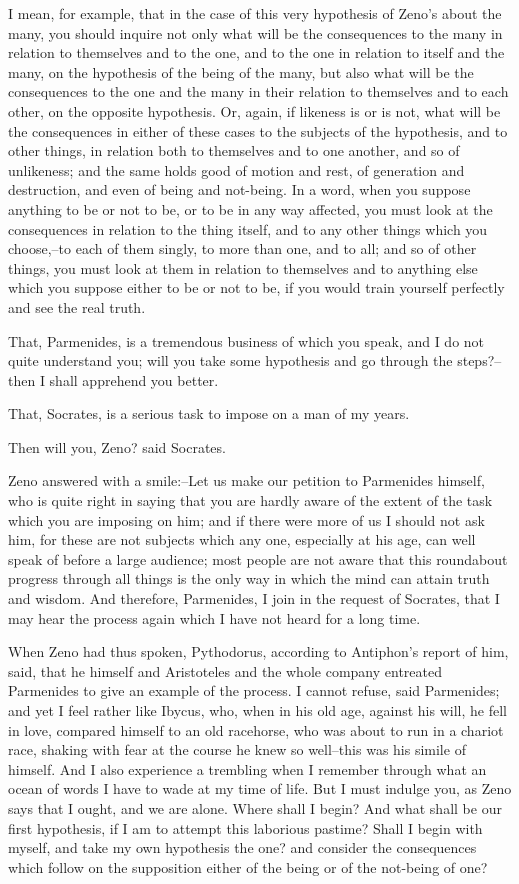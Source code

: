 I mean, for example, that in the case of this very hypothesis of
Zeno's about the many, you should inquire not only what will be the
consequences to the many in relation to themselves and to the one, and
to the one in relation to itself and the many, on the hypothesis of the
being of the many, but also what will be the consequences to the one
and the many in their relation to themselves and to each other, on the
opposite hypothesis. Or, again, if likeness is or is not, what will
be the consequences in either of these cases to the subjects of the
hypothesis, and to other things, in relation both to themselves and to
one another, and so of unlikeness; and the same holds good of motion and
rest, of generation and destruction, and even of being and not-being.
In a word, when you suppose anything to be or not to be, or to be in any
way affected, you must look at the consequences in relation to the
thing itself, and to any other things which you choose,--to each of them
singly, to more than one, and to all; and so of other things, you must
look at them in relation to themselves and to anything else which you
suppose either to be or not to be, if you would train yourself perfectly
and see the real truth.

That, Parmenides, is a tremendous business of which you speak, and I do
not quite understand you; will you take some hypothesis and go through
the steps?--then I shall apprehend you better.

That, Socrates, is a serious task to impose on a man of my years.

Then will you, Zeno? said Socrates.

Zeno answered with a smile:--Let us make our petition to Parmenides
himself, who is quite right in saying that you are hardly aware of the
extent of the task which you are imposing on him; and if there were more
of us I should not ask him, for these are not subjects which any one,
especially at his age, can well speak of before a large audience; most
people are not aware that this roundabout progress through all things
is the only way in which the mind can attain truth and wisdom. And
therefore, Parmenides, I join in the request of Socrates, that I may
hear the process again which I have not heard for a long time.

When Zeno had thus spoken, Pythodorus, according to Antiphon's report
of him, said, that he himself and Aristoteles and the whole company
entreated Parmenides to give an example of the process. I cannot refuse,
said Parmenides; and yet I feel rather like Ibycus, who, when in his
old age, against his will, he fell in love, compared himself to an old
racehorse, who was about to run in a chariot race, shaking with fear at
the course he knew so well--this was his simile of himself. And I also
experience a trembling when I remember through what an ocean of words
I have to wade at my time of life. But I must indulge you, as Zeno says
that I ought, and we are alone. Where shall I begin? And what shall be
our first hypothesis, if I am to attempt this laborious pastime? Shall I
begin with myself, and take my own hypothesis the one? and consider the
consequences which follow on the supposition either of the being or of
the not-being of one?

